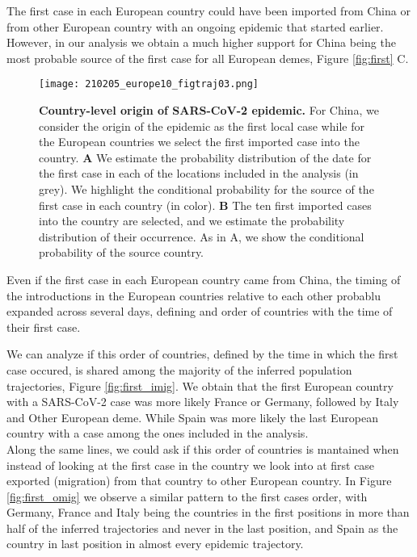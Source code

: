 The first case in each European country could have been imported from China or from other European country with an ongoing epidemic that started earlier. However, in our analysis we obtain a much higher support for China being the most probable source of the first case for all European demes, Figure \ref{fig:first} C.\\

\begin{figure}[h]
    \centering
    \texttt{[image: 210205\_europe10\_figtraj03.png]}
    \caption{\textbf{Country-level origin of SARS-CoV-2 epidemic.} For China, we consider the origin of the epidemic as the first local case while for the European countries we select the first imported case into the country. \textbf{A} We estimate the probability distribution of the date for the first case in each of the locations included in the analysis (in grey). We highlight the conditional probability for the source of the first case in each country (in color).  \textbf{B} The ten first imported cases into the country are selected, and we estimate the probability distribution of their occurrence. As in A, we show the conditional probability of the source country.}
    \label{fig:firstcountry}
\end{figure}

Even if the first case in each European country came from China, the timing of the introductions in the European countries relative to each other probablu expanded across several days, defining and order of countries with the time of their first case. 

We can analyze if this order of countries, defined by the time in which the first case occured, is shared among the majority of the inferred population trajectories, Figure \ref{fig:first_imig}. We obtain that the first European country with a SARS-CoV-2 case was more likely France or Germany, followed by Italy and Other European deme. While Spain was more likely the last European country with a case among the ones included in the analysis.\\

Along the same lines, we could ask if this order of countries is mantained when instead of looking at the first case in the country we look into at first case exported (migration) from that country to other European country. In Figure \ref{fig:first_omig} we observe a similar pattern to the first cases order, with Germany, France and Italy being the countries in the first positions in more than half of the inferred trajectories and never in the last position, and Spain as the country in last position in almost every epidemic trajectory.\\


